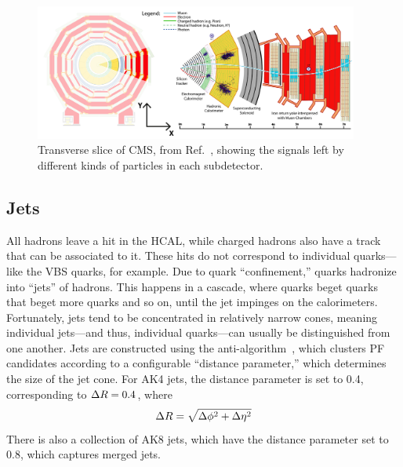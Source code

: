 \begin{figure}[htb]
    \centering
    \includegraphics[width=0.95\textwidth]{fig/cms/particle_id_slice.pdf}
    \caption{
        Transverse slice of CMS, from Ref.~\cite{Davis:2205172}, showing the signals left by different kinds of particles in each subdetector.
    }
    \label{fig:cms_particle_id}
\end{figure}

\subsection{Jets}
All hadrons leave a hit in the HCAL, while charged hadrons also have a track that can be associated to it. 
These hits do not correspond to individual quarks---like the VBS quarks, for example. 
Due to quark ``confinement,'' quarks hadronize into ``jets'' of hadrons. 
This happens in a cascade, where quarks beget quarks that beget more quarks and so on, until the jet impinges on the calorimeters. 
Fortunately, jets tend to be concentrated in relatively narrow cones, meaning individual jets---and thus, individual quarks---can usually be distinguished from one another. 
Jets are constructed using the anti-\kt algorithm~\cite{Cacciari:2008gp, Cacciari:2011ma}, which clusters PF candidates according to a configurable ``distance parameter,'' which determines the size of the jet cone. %
For AK4 jets, the distance parameter is set to 0.4, corresponding to $\Delta R = 0.4$, where
\begin{equation}
    \Delta R = \sqrt{\Delta\phi^2 + \Delta\eta^2}
\end{equation}
There is also a collection of AK8 jets, which have the distance parameter set to 0.8, which captures merged jets.

